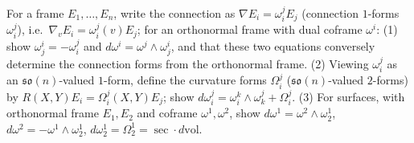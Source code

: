 \begin{remark}
  \label{rem:pet-ch3-ex-28}
  \leanok
  For a frame $E_1,\dots,E_n$, write the connection as $\nabla E_i=\omega^j_iE_j$
  (connection $1$-forms $\omega^j_i$), i.e.\ $\nabla_vE_i=\omega^j_i(v)E_j$; for
  an orthonormal frame with dual coframe $\omega^i$: (1) show $\omega^i_j=-\omega^j_i$
  and $d\omega^i=\omega^j\wedge\omega^i_j$, and that these two equations
  conversely determine the connection forms from the orthonormal frame. (2)
  Viewing $\omega^j_i$ as an $\mathfrak{so}(n)$-valued $1$-form, define the
  curvature forms $\Omega^j_i$ ($\mathfrak{so}(n)$-valued $2$-forms) by
  $R(X,Y)E_i=\Omega^j_i(X,Y)E_j$; show
  $d\omega^j_i=\omega^k_i\wedge\omega^j_k+\Omega^j_i$. (3) For surfaces, with
  orthonormal frame $E_1,E_2$ and coframe $\omega^1,\omega^2$, show
  $d\omega^1=\omega^2\wedge\omega^1_2$, $d\omega^2=-\omega^1\wedge\omega^1_2$,
  $d\omega^1_2=\Omega^1_2=\sec\cdot d\mathrm{vol}$.
\end{remark}

